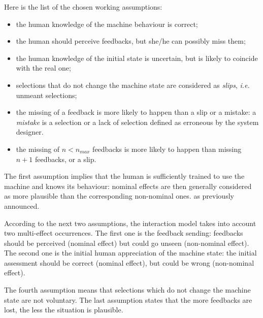 Here is the list of the chosen working assumptions:
%
\begin{itemize}
\item the human knowledge of the machine behaviour is correct;
\item the human should perceive feedbacks, but she/he can possibly miss them;
\item the human knowledge of the initial state is uncertain, but is likely to coincide with the real one;
\item selections that do not change the machine state are considered as {\em slips}, \textit{i.e.} unmeant selections;
\item the missing of a feedback is more likely to happen than a slip or a mistake:
a \textit{mistake} is a selection or a lack of selection 
defined as erroneous by the system designer.
\item the missing of $n<n_{max}$ feedbacks is more likely to happen than missing $n+1$ feedbacks, or a slip.
\end{itemize}
The first assumption implies that the human is sufficiently 
trained to use the machine and knows its behaviour: 
nominal effects are then generally considered
as more plausible than the corresponding non-nominal ones.
as previously announced.

According to the next two assumptions, the interaction model takes 
into account two multi-effect occurrences. The first one 
is the feedback sending: feedbacks should be perceived 
(nominal effect) but could go unseen (non-nominal effect). 
The second one is the initial human appreciation of the 
machine state: the initial assessment should be correct 
(nominal effect), but could be wrong (non-nominal effect).

The fourth assumption means that selections which do not change 
the machine state are not voluntary. 
The last assumption states that the more feedbacks
are lost, the less the situation is plausible.


